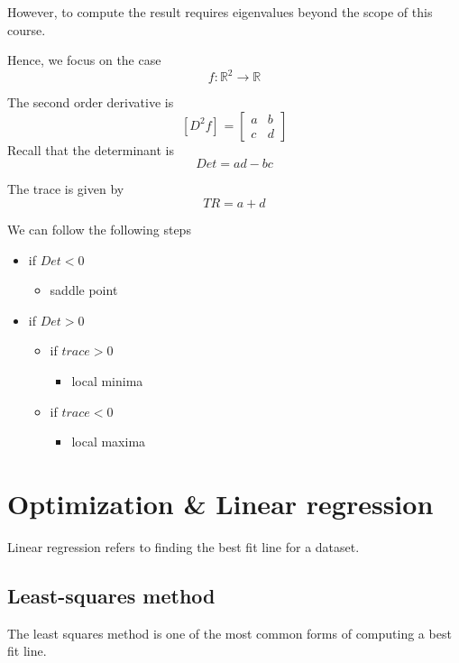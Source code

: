 However, to compute the result requires eigenvalues beyond the scope of this course.


Hence, we focus on the case
\[
   f: \mathbb{R}^2 \rightarrow \mathbb{R}
\] 

\begin{framed}
   The second order derivative is
   \[
     \left[ D^2 f \right]_{}  = \begin{bmatrix} 
        a & b \\ c & d  
     \end{bmatrix}
   \] 
   Recall that the determinant is
   \[
     Det = ad - bc
   \] 

   The trace is given by
   \[
     TR = a + d
   \] 
\end{framed}

We can follow the following steps 
\begin{itemize} 
   \item if $Det < 0$
      \begin{itemize}
         \item saddle point
      \end{itemize}
   \item if  $Det > 0$ 
      \begin{itemize}
         \item  if $ trace > 0$
            \begin{itemize}
               \item local minima
            \end{itemize}
         \item  if $ trace < 0$ 
            \begin{itemize}
               \item local maxima
            \end{itemize}
      \end{itemize}
\end{itemize}


\section{Optimization \& Linear regression}
Linear regression refers to finding the best fit line for a dataset.

\subsection{Least-squares method}
The least squares method is one of the most common forms of computing a best fit line.

